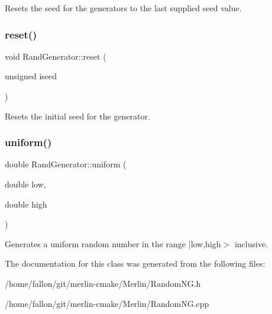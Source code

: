 Resets the seed for the generators to the last supplied seed value. \mbox{\label{classRandGenerator_a32087c36d8e6d3edda4775532d921132}} 
\subsubsection{\texorpdfstring{reset()}{reset()}\hspace{0.1cm}{\footnotesize\ttfamily [2/2]}}
{\footnotesize\ttfamily void Rand\+Generator\+::reset (\begin{DoxyParamCaption}\item[{unsigned}]{iseed }\end{DoxyParamCaption})}

Resets the initial seed for the generator. \mbox{\label{classRandGenerator_a7a6a4584608b9a834c83767606204695}} 
\subsubsection{\texorpdfstring{uniform()}{uniform()}}
{\footnotesize\ttfamily double Rand\+Generator\+::uniform (\begin{DoxyParamCaption}\item[{double}]{low,  }\item[{double}]{high }\end{DoxyParamCaption})}

Generates a uniform random number in the range $\vert$low,high$>$ inclusive. 

The documentation for this class was generated from the following files\+:\begin{DoxyCompactItemize}
\item 
/home/fallon/git/merlin-\/cmake/\+Merlin/Random\+N\+G.\+h\item 
/home/fallon/git/merlin-\/cmake/\+Merlin/Random\+N\+G.\+cpp\end{DoxyCompactItemize}
